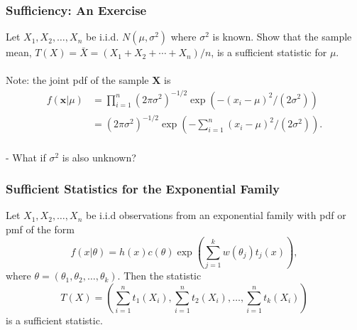 \documentclass{beamer}
\begin{document}
\begin{frame}
\frametitle{Sufficiency: An Exercise}
Let $X_1,X_2,\ldots,X_n$ be i.i.d. $N(\mu,\sigma^2)$ where $\sigma^2$ is known. Show that the sample mean, $T(X) = \bar{X} = (X_1+X_2+\cdots+X_n)/n$, is a sufficient statistic for $\mu$.
\\~\\
Note: the joint pdf of the sample $\mathbf{X}$ is
$$
\begin{aligned}
f(\mathbf{x}|\mu) &= \prod_{i=1}^n (2\pi \sigma^2)^{-1/2} \exp(-(x_i - \mu)^2/(2\sigma^2))\\
&=(2\pi \sigma^2)^{-1/2} \exp(-\sum_{i=1}^n(x_i - \mu)^2/(2\sigma^2)).
\end{aligned}
$$
~\\
- What if $\sigma^2$ is also unknown? \\
\end{frame}


\begin{frame}
\frametitle{Sufficient Statistics for the Exponential Family}
Let $X_1,X_2,\ldots,X_n$ be i.i.d observations from an exponential family with pdf or pmf of the form
$$
f(x|\theta) = h(x)c(\theta)\exp\left(\sum_{j=1}^k w(\theta_j)t_j(x)\right),
$$
where $\theta = (\theta_1,\theta_2,\ldots,\theta_k)$. Then the statistic
$$
T(X) = \left(\sum_{i=1}^n t_1(X_i),\sum_{i=1}^n t_2(X_i),\ldots,\sum_{i=1}^n t_k(X_i)\right)
$$
is a sufficient statistic.
\end{frame}
\end{document}
